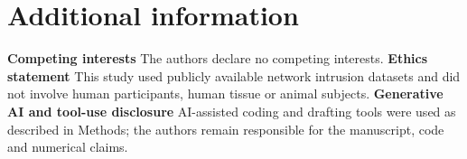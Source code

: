 \documentclass[fleqn,10pt]{wlscirep}
\begin{document}
\section*{Additional information}

\textbf{Competing interests} The authors declare no competing interests. \textbf{Ethics statement} This study used publicly available network intrusion datasets and did not involve human participants, human tissue or animal subjects. \textbf{Generative AI and tool-use disclosure} AI-assisted coding and drafting tools were used as described in Methods; the authors remain responsible for the manuscript, code and numerical claims.
\end{document}
